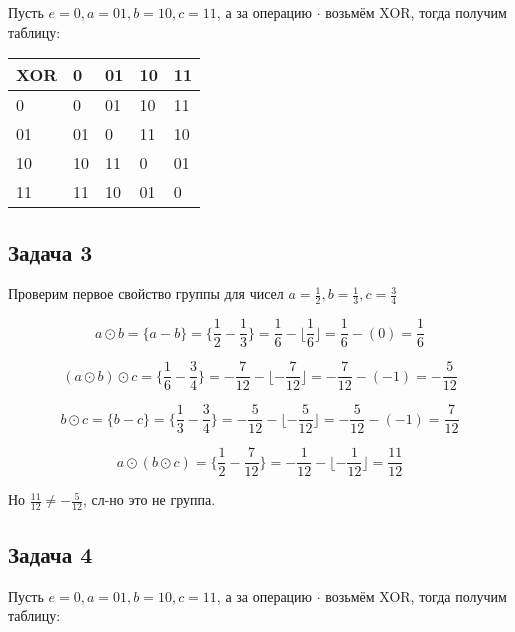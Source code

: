 \documentclass[a4paper,14pt]{article} %
\begin{document}
Пусть $e = 0, a = 01, b = 10, c = 11$, а за операцию $\cdot$ возьмём XOR, тогда получим таблицу:

\begin{table}[H]
	\begin{tabular}{|l|l|l|l|l|}
	\hline
	XOR & 0  & 01 & 10 & 11 \\ \hline
	0   & 0  & 01 & 10 & 11 \\ \hline
	01  & 01 & 0  & 11 & 10 \\ \hline
	10  & 10 & 11 & 0  & 01 \\ \hline
	11  & 11 & 10 & 01 & 0  \\ \hline
	\end{tabular}
	\end{table}

\subsection{Задача 3}
Проверим первое свойство группы для чисел $a = \frac{1}{2}, b = \frac{1}{3}, c = \frac{3}{4}$

\begin{equation*}
	a \odot b = \{ a - b\} = \{\frac{1}{2} - \frac{1}{3}\} = \frac{1}{6} - \lfloor \frac{1}{6} \rfloor = \frac{1}{6} - (0) = \frac{1}{6}
\end{equation*}

\begin{equation*}
	(a \odot b) \odot c = \{\frac{1}{6} - \frac{3}{4}\} = -\frac{7}{12} - \lfloor -\frac{7}{12} \rfloor = -\frac{7}{12} - (-1) = -\frac{5}{12}
\end{equation*}

\begin{equation*}
	b \odot  c = \{b - c\} = \{\frac{1}{3} - \frac{3}{4}\} = -\frac{5}{12} - \lfloor -\frac{5}{12} \rfloor = -\frac{5}{12} - (-1) = \frac{7}{12}
\end{equation*}

\begin{equation*}
	a \odot (b \odot c) = \{\frac{1}{2} - \frac{7}{12}\} = -\frac{1}{12} - \lfloor -\frac{1}{12} \rfloor = \frac{11}{12}
\end{equation*}

Но $\frac{11}{12} \not = -\frac{5}{12}$, сл-но это не группа.


\subsection{Задача 4}
Пусть $e = 0, a = 01, b = 10, c = 11$, а за операцию $\cdot$ возьмём XOR, тогда получим таблицу:
\end{document}
